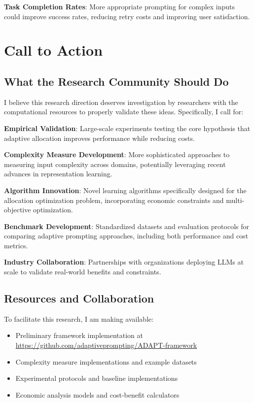 \documentclass[11pt,a4paper]{article}
\begin{document}
\textbf{Task Completion Rates}: More appropriate prompting for complex inputs could improve success rates, reducing retry costs and improving user satisfaction.

\section{Call to Action}

\subsection{What the Research Community Should Do}

I believe this research direction deserves investigation by researchers with the computational resources to properly validate these ideas. Specifically, I call for:

\textbf{Empirical Validation}: Large-scale experiments testing the core hypothesis that adaptive allocation improves performance while reducing costs.

\textbf{Complexity Measure Development}: More sophisticated approaches to measuring input complexity across domains, potentially leveraging recent advances in representation learning.

\textbf{Algorithm Innovation}: Novel learning algorithms specifically designed for the allocation optimization problem, incorporating economic constraints and multi-objective optimization.

\textbf{Benchmark Development}: Standardized datasets and evaluation protocols for comparing adaptive prompting approaches, including both performance and cost metrics.

\textbf{Industry Collaboration}: Partnerships with organizations deploying LLMs at scale to validate real-world benefits and constraints.

\subsection{Resources and Collaboration}

To facilitate this research, I am making available:
\begin{itemize}
\item Preliminary framework implementation at \url{https://github.com/adaptiveprompting/ADAPT-framework}
\item Complexity measure implementations and example datasets
\item Experimental protocols and baseline implementations
\item Economic analysis models and cost-benefit calculators
\end{itemize}
\end{document}
